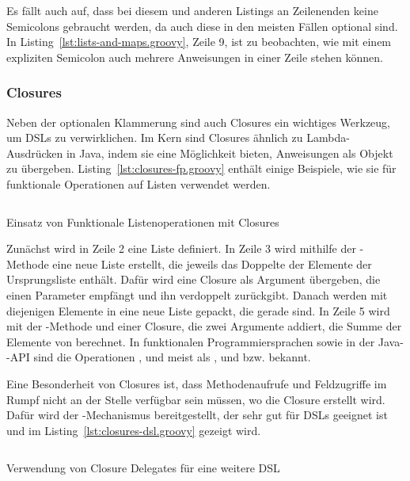 \documentclass[a4paper]{article}
\newcommand{\codelisting}[3]{
\begin{listing}[ht]
	\inputminted{#1}{#1/#2}
	\caption{#3}
	\label{lst:#2}
\end{listing}
}
\begin{document}
Es fällt auch auf, dass bei diesem und anderen Listings an Zeilenenden keine Semicolons gebraucht werden, da auch diese in den meisten Fällen optional sind.
In Listing~\ref{lst:lists-and-maps.groovy}, Zeile 9, ist zu beobachten, wie mit einem expliziten Semicolon auch mehrere Anweisungen in einer Zeile stehen können.

\subsubsection{Closures}\label{subsubsec:closures}

Neben der optionalen Klammerung sind auch Closures ein wichtiges Werkzeug, um DSLs zu verwirklichen.
Im Kern sind Closures ähnlich zu Lambda-Ausdrücken in Java, indem sie eine Möglichkeit bieten, Anweisungen als Objekt zu übergeben.
Listing~\ref{lst:closures-fp.groovy} enthält einige Beispiele, wie sie für funktionale Operationen auf Listen verwendet werden.

\codelisting{groovy}{closures-fp.groovy}{Einsatz von Funktionale Listenoperationen mit Closures}

Zunächst wird in Zeile 2 eine Liste definiert.
In Zeile 3 wird mithilfe der -Methode eine neue Liste erstellt, die jeweils das Doppelte der Elemente der Ursprungsliste enthält.
Dafür wird eine Closure als Argument übergeben, die einen Parameter  empfängt und ihn verdoppelt zurückgibt.
Danach werden mit  diejenigen Elemente in eine neue Liste gepackt, die gerade sind.
In Zeile 5 wird mit der -Methode und einer Closure, die zwei Argumente addiert, die Summe der Elemente von  berechnet.
In funktionalen Programmiersprachen sowie in der Java--API sind die Operationen ,  und  meist als ,  und  bzw.  bekannt.

Eine Besonderheit von Closures ist, dass Methodenaufrufe und Feldzugriffe im Rumpf nicht an der Stelle verfügbar sein müssen, wo die Closure erstellt wird.
Dafür wird der -Mechanismus bereitgestellt, der sehr gut für DSLs geeignet ist und im Listing~\ref{lst:closures-dsl.groovy} gezeigt wird.

\codelisting{groovy}{closures-dsl.groovy}{Verwendung von Closure Delegates für eine weitere DSL}
\end{document}
